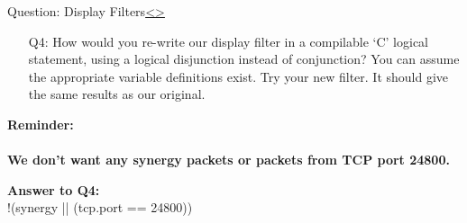 \documentclass[12pt]{extarticle}
\newenvironment{instructionblock}{\Large\bgroup}{\egroup}
\begin{document}
\pagebreak
\begin{slide}{Question: Display Filters}{\hyperref[slide 12]{\textless}\hyperref[slide 14]{\textgreater}}
\vskip 5pt
\begin{instructionblock}
\begin{enumerate}
\item[Q4:] How would you re-write our display filter in a compilable `C' logical statement, using a logical disjunction instead of conjunction?  You can assume the appropriate variable definitions exist.  Try your new filter.  It should give the same results as our original.
\end{enumerate}
\textbf{Reminder: \\ \\
	 We don't want any synergy packets or packets from TCP port 24800.}
\end{instructionblock}
\end{slide}
\vfill

\noindent
\textbf{Answer to Q4:}\\
!(synergy || (tcp.port == 24800))



\end{document}
